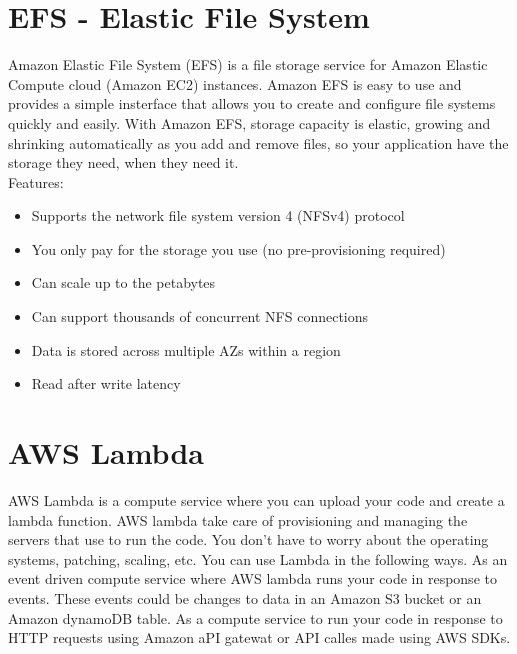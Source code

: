 \documentclass{article}
\begin{document}
\section{EFS - Elastic File System}
Amazon Elastic File System (EFS) is a file storage service for Amazon Elastic Compute cloud (Amazon EC2) instances. Amazon EFS is easy to use and provides a simple insterface that allows you to create and configure file systems quickly and easily. With Amazon EFS, storage capacity is elastic, growing and shrinking automatically as you add and remove files, so your application have the storage they need, when they need it. \\

Features:
\begin{itemize}
\item
Supports the network file system version 4 (NFSv4) protocol

\item
You only pay for the storage you use (no pre-provisioning required)

\item
Can scale up to the petabytes

\item
Can support thousands of concurrent NFS connections

\item
Data is stored across multiple AZs within a region

\item
Read after write latency

\end{itemize}

\section{AWS Lambda}
AWS Lambda is a compute service where you can upload your code and create a lambda function. AWS lambda take care of provisioning and managing the servers that use to run the code. You don't have to worry about the operating systems, patching, scaling, etc. You can use Lambda in the following ways. As an event driven compute service where AWS lambda runs your code in response to events. These events could be changes to data in an Amazon S3 bucket or an Amazon dynamoDB table. As a compute service to run your code in response to HTTP requests using Amazon aPI gatewat or API calles made using AWS SDKs.
\end{document}
